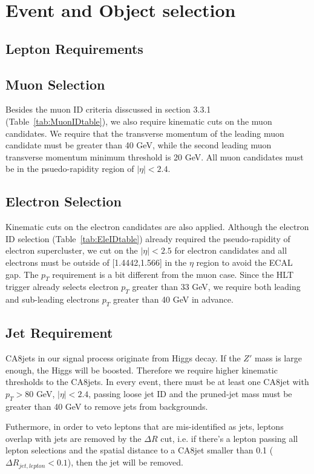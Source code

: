 \newpage
\section{Event and Object selection}


\subsection{Lepton Requirements}

\subsection*{Muon Selection}

Besides the muon ID criteria disscussed in section 3.3.1 (Table~\ref{tab:MuonIDtable}), we also require kinematic cuts on the muon candidates. We require that the transverse momentum of the leading muon candidate must be greater than 40 GeV, while the second leading muon transverse momentum minimum threshold is 20 GeV. All muon candidates must be in the psuedo-rapidity region of $|\eta| < 2.4$.

\subsection*{Electron Selection}
Kinematic cuts on the electron candidates are also applied. Although the electron ID selection (Table~\ref{tab:EleIDtable}) already required the pseudo-rapidity of electron supercluster, we cut on the $|\eta| < 2.5$ for electron candidates and all electrons must be outside of [1.4442,1.566] in the $\eta$ region to avoid the ECAL gap. The $p_{T}$ requirement is a bit different from the muon case. Since the HLT trigger already selects electron $p_{T}$ greater than 33 GeV, we require both leading and sub-leading electrons $p_{T}$ greater than 40 GeV in advance.

\subsection{Jet Requirement}
CA8jets in our signal process originate from Higgs decay. If the $Z'$ mass is large enough, the Higgs will be boosted. Therefore we require higher kinematic thresholds to the CA8jets. In every event, there must be at least one CA8jet with $p_{T} > 80$ GeV, $|\eta| < 2.4$, passing loose jet ID and the pruned-jet mass must be greater than 40 GeV to remove jets from backgrounds.

Futhermore, in order to veto leptons that are mis-identified as jets, leptons overlap with jets are removed by the $\Delta R$ cut, i.e. if there's a lepton passing all lepton selections and the spatial distance to a CA8jet smaller than 0.1 ($\Delta R_{jet,lepton} < 0.1$), then the jet will be removed.


